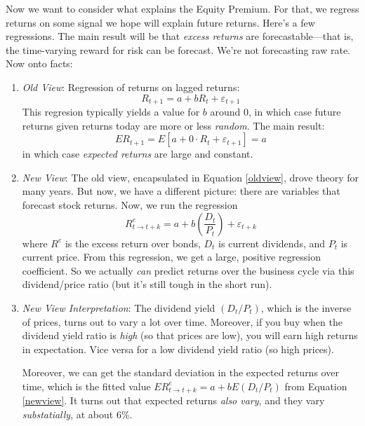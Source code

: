 \documentclass[a4paper,12pt]{scrartcl}
\begin{document}
Now we want to consider what explains the Equity Premium. For that,
we regress returns on some signal we hope will explain future returns.
Here's a few regressions. The main result will be that
\emph{excess returns} are forecastable---that is, the time-varying
reward for risk can be forecast. We're not forecasting raw rate.
Now onto facts:
\begin{enumerate}
    \item {\sl Old View}: Regression of returns on lagged returns:
	    \[ R_{t+1} = a + b R_t + \varepsilon_{t+1} \]
	This regresion typically yields a value for $b$ around
	0, in which case future returns given returns today
	are more or less \emph{random}.  The main result:
	\begin{equation}
	    \label{oldview}
	    ER_{t+1} = E[a + 0\cdot R_t + \varepsilon_{t+1}] = a
	\end{equation}
	in which case \emph{expected returns} are large and constant.
    \item {\sl New View}: The old view, encapsulated in Equation \ref{oldview},
	drove theory for many years. But now, we have a different
	picture: there are variables that forecast stock returns.
	Now, we run the regression
	\begin{equation}
	    \label{newview}
	    R^e_{t\rightarrow t+k} = a + b \left(\frac{D_t}{P_t}\right)
		+ \varepsilon_{t+k}
	\end{equation}
	where $R^e$ is the excess return over bonds, $D_t$ is current
	dividends, and $P_t$ is current price. From this regression,
	we get a large, positive regression coefficient.
	So we actually \emph{can} predict returns over the business
	cycle via this dividend/price ratio (but it's still tough
	in the short run).

    \item {\sl New View Interpretation}: The dividend yield $(D_t/P_t)$, which
	is the inverse of prices, turns out to vary a lot over time.
	Moreover, if you buy when the dividend yield ratio is
	\emph{high} (so that prices are low), you will earn high
	returns in expectation.  Vice versa for a low dividend yield
	ratio (so high prices).

	Moreover, we can get the standard deviation in the expected returns over
	time, which is the fitted value $ER^e_{t\rightarrow t+k} = a + b
	E\left(D_t/P_t\right)$ from Equation \ref{newview}. It turns
	out that expected returns \emph{also vary}, and they vary
	\emph{substatially}, at about 6\%.


\end{enumerate}
\end{document}
